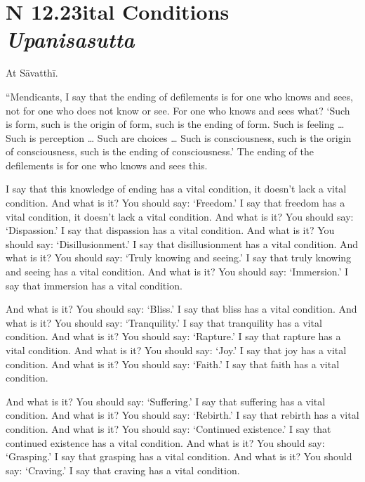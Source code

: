 \documentclass[12pt,openany]{book}%
\newcommand*{\suttatitleacronym}[1]{\smaller[2]{#1}\vspace*{.3em}}
\newcommand*{\suttatitletranslation}[1]{\linebreak{#1}}
\newcommand*{\suttatitleroot}[1]{\linebreak\smaller[2]\itshape{#1}}
\newcommand*{\tocacronym}[1]{\hspace*{-3.3em}{#1}\quad}
\newcommand*{\toctranslation}[1]{#1}
\newcommand*{\tocroot}[1]{(\textit{#1})}
\begin{document}
%
\section*{{\suttatitleacronym SN 12.23}{\suttatitletranslation Vital Conditions }{\suttatitleroot Upanisasutta}}
\addcontentsline{toc}{section}{\tocacronym{SN 12.23} \toctranslation{Vital Conditions } \tocroot{Upanisasutta}}

At \textsanskrit{Sāvatthī}. 

“Mendicants, I say that the ending of defilements is for one who knows and sees, not for one who does not know or see. For one who knows and sees what? ‘Such is form, such is the origin of form, such is the ending of form. Such is feeling … Such is perception … Such are choices … Such is consciousness, such is the origin of consciousness, such is the ending of consciousness.’ The ending of the defilements is for one who knows and sees this. 

I say that this knowledge of ending has a vital condition, it doesn’t lack a vital condition. And what is it? You should say: ‘Freedom.’ I say that freedom has a vital condition, it doesn’t lack a vital condition. And what is it? You should say: ‘Dispassion.’ I say that dispassion has a vital condition. And what is it? You should say: ‘Disillusionment.’ I say that disillusionment has a vital condition. And what is it? You should say: ‘Truly knowing and seeing.’ I say that truly knowing and seeing has a vital condition. And what is it? You should say: ‘Immersion.’ I say that immersion has a vital condition. 

And what is it? You should say: ‘Bliss.’ I say that bliss has a vital condition. And what is it? You should say: ‘Tranquility.’ I say that tranquility has a vital condition. And what is it? You should say: ‘Rapture.’ I say that rapture has a vital condition. And what is it? You should say: ‘Joy.’ I say that joy has a vital condition. And what is it? You should say: ‘Faith.’ I say that faith has a vital condition. 

And what is it? You should say: ‘Suffering.’ I say that suffering has a vital condition. And what is it? You should say: ‘Rebirth.’ I say that rebirth has a vital condition. And what is it? You should say: ‘Continued existence.’ I say that continued existence has a vital condition. And what is it? You should say: ‘Grasping.’ I say that grasping has a vital condition. And what is it? You should say: ‘Craving.’ I say that craving has a vital condition. 
\end{document}
